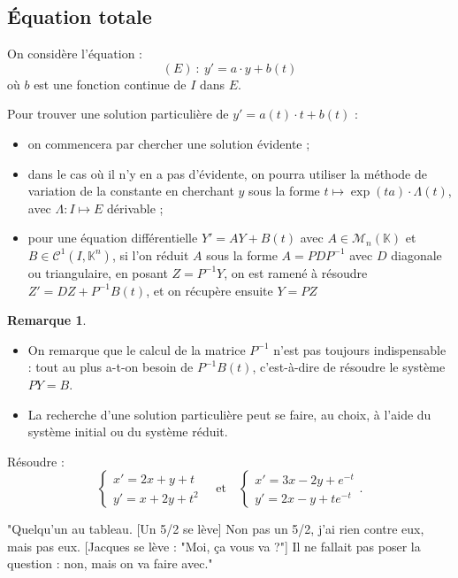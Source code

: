 \documentclass[french]{article}
\newcommand{\K}{\mathbb{K}}
\newcommand{\inv}{^{-1}}
\theoremstyle{plain}
\theoremstyle{definition}
\newtheorem*{rmq}{Remarque}
\theoremstyle{remark}
\begin{document}
\subsection{Équation totale}

On considère l'équation :
$$(E)\ :\ y'=a\cdot y+b(t)$$
où $b$ est une fonction continue de $I$ dans $E$.

\begin{met}
	Pour trouver une solution particulière de $y'=a(t)\cdot t+b(t)$ :
	\begin{itemize}
		\item on commencera par chercher une solution évidente ;
		\item dans le cas où il n'y en a pas d'évidente, on pourra utiliser la méthode de variation de la constante en cherchant $y$ sous la forme $t\mapsto\exp(ta)\cdot\Lambda(t)$, avec $\Lambda:I\mapsto E$ dérivable ;
		\item pour une équation différentielle $Y'=AY+B(t)$ avec $A\in\mathcal{M}_n(\K)$ et $B\in\mathcal{C}^1(I,\K^n)$, si l'on réduit $A$ sous la forme $A=PDP\inv$ avec $D$ diagonale ou triangulaire, en posant $Z=P\inv Y$, on est ramené à résoudre $Z'=DZ+P\inv B(t)$, et on récupère ensuite $Y=PZ$
	\end{itemize}
\end{met}

\begin{rmq}
	\begin{itemize}
		\item On remarque que le calcul de la matrice $P\inv$ n'est pas toujours indispensable : tout au plus a-t-on besoin de $P\inv B(t)$, c'est-à-dire de résoudre le système $PY=B$.
		\item La recherche d'une solution particulière peut se faire, au choix, à l'aide du système initial ou du système réduit.
	\end{itemize}
\end{rmq}

\begin{exo}
	Résoudre :
	$$\begin{cases}
		x'=2x+y+t\\
		y'=x+2y+t^2
	\end{cases}\quad\text{et}\quad\begin{cases}
	x'=3x-2y+e^{-t}\\
	y'=2x-y+te^{-t}
	\end{cases}.$$
\end{exo}

"Quelqu'un au tableau. [Un 5/2 se lève] Non pas un 5/2, j'ai rien contre eux, mais pas eux. [Jacques se lève : "Moi, ça vous va ?"] Il ne fallait pas poser la question : non, mais on va faire avec."
\end{document}

